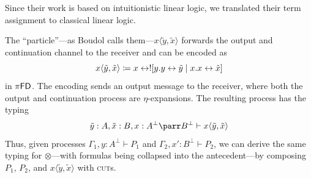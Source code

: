 \begin{remark}
  Since their work is based on intuitionistic linear logic, we translated
  their term assignment to classical linear logic.
\end{remark}

The \enquote{particle}---as Boudol calls them---$x\langle\tilde{y},\tilde{x}\rangle$ forwards the output and continuation channel
to the receiver and can be encoded as
\[
  x\langle\tilde{y},\tilde{x}\rangle \coloneq x \leftrightarrow ! [y.y \leftrightarrow \tilde{y} \mid x.x \leftrightarrow \tilde{x}]
\]
in $\pi\textsf{FD}$. The encoding sends an output message to the receiver, where
both the output and continuation process are $\eta$-expansions. The resulting process
has the typing
\[
  \tilde{y} : A, \tilde{x} : B, x : A^\bot \parr B^\bot \vdash x\langle\tilde{y},\tilde{x}\rangle
\]
Thus, given processes $\Gamma_1, y : A^\bot \vdash P_1$ and $\Gamma_2, x' : B^\bot \vdash P_2$,
we can derive the same typing for $\otimes$---with formulas being collapsed into the antecedent---by
composing $P_1$, $P_2$, and $x\langle\tilde{y},\tilde{x}\rangle$ with \textsc{cut}s.